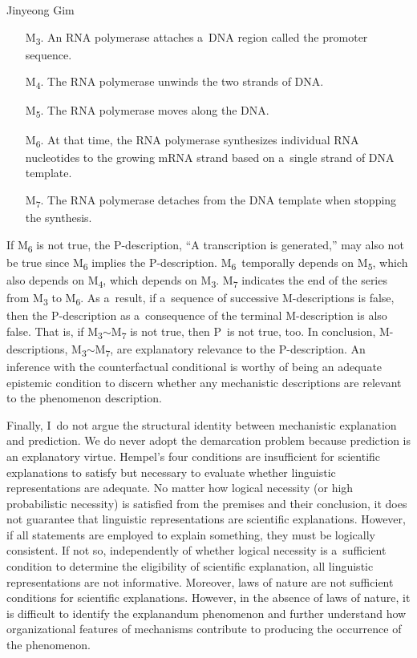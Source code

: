 \begin{artengenv}{Jinyeong Gim}
\begin{itemize}
    \item[M\textsubscript{3}.] An RNA polymerase attaches a~DNA region called the promoter sequence.
    \item[M\textsubscript{4}.] The RNA polymerase unwinds the two strands of DNA.
    \item[M\textsubscript{5}.] The RNA polymerase moves along the DNA.
    \item[M\textsubscript{6}.] At that time, the RNA polymerase synthesizes individual RNA nucleotides to the growing mRNA strand based on a~single strand of DNA template.
    \item[M\textsubscript{7}.] The RNA polymerase detaches from the DNA template when stopping the synthesis.
\end{itemize}



If M\textsubscript{6} is not true, the P-description, ``A transcription is generated,'' may also not be true since M\textsubscript{6} implies the P-description. M\textsubscript{6}~temporally depends on M\textsubscript{5}, which also depends on M\textsubscript{4}, which depends on M\textsubscript{3}. M\textsubscript{7} indicates the end of the series from M\textsubscript{3} to M\textsubscript{6}. As a~result, if a~sequence of successive M-descriptions is false, then the P-description as a~consequence of the terminal M-description is also false. That is, if M\textsubscript{3}$\sim$M\textsubscript{7} is not true, then P~is not true, too. In conclusion, M-descriptions, M\textsubscript{3}$\sim$M\textsubscript{7}, are explanatory relevance to the P-description. An inference with the counterfactual conditional is worthy of being an adequate epistemic condition to discern whether any mechanistic descriptions are relevant to the phenomenon description.

Finally, I~do not argue the structural identity between mechanistic explanation and prediction. We do never adopt the demarcation problem because prediction is an explanatory virtue. Hempel's four conditions are insufficient for scientific explanations to satisfy but necessary to evaluate whether linguistic representations are adequate. No matter how logical necessity (or high probabilistic necessity) is satisfied from the premises and their conclusion, it does not guarantee that linguistic representations are scientific explanations. However, if all statements are employed to explain something, they must be logically consistent. If not so, independently of whether logical necessity is a~sufficient condition to determine the eligibility of scientific explanation, all linguistic representations are not informative. Moreover, laws of nature are not sufficient conditions for scientific explanations. However, in the absence of laws of nature, it is difficult to identify the explanandum phenomenon and further understand how organizational features of mechanisms contribute to producing the occurrence of the phenomenon.


\end{artengenv}
